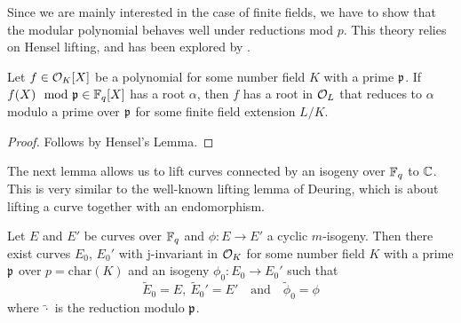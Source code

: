 Since we are mainly interested in the case of finite fields, we have to show that the modular polynomial behaves well under reductions mod $p$.
This theory relies on Hensel lifting, and has been explored by \cite{deuring_endomorphism_rings}.
\begin{lemma}
    \label{prop:modified_hensel_lifting}
    Let $f \in \mathcal{O}_K[X]$ be a polynomial for some number field $K$ with a prime $\mathfrak{p}$.
    If $f(X) \mod {\mathfrak{p}} \in \mathbb{F}_q[X]$ has a root $\alpha$, then $f$ has a root in $\mathcal{O}_L$ that reduces to $\alpha$ modulo a prime over $\mathfrak{p}$ for some finite field extension $L/K$.
\end{lemma}
\begin{proof}
    Follows by Hensel's Lemma.
\end{proof}
The next lemma allows us to lift curves connected by an isogeny over $\mathbb{F}_q$ to $\mathbb{C}$.
This is very similar to the well-known lifting lemma of Deuring, which is about lifting a curve together with an endomorphism.
\begin{lemma}
    Let $E$ and $E'$ be curves over $\mathbb{F}_q$ and $\phi: E \to E'$ a cyclic $m$-isogeny.
    Then there exist curves $E_0$, $E_0'$ with j-invariant in $\mathcal{O}_K$ for some number field $K$ with a prime $\mathfrak{p}$ over $p = \mathrm{char}(K)$ and an isogeny $\phi_0: E_0 \to E_0'$ such that
    \begin{equation*}
        \tilde{E}_0 = E, \ \tilde{E}_0' = E' \quad \text{and} \quad \tilde{\phi}_0 = \phi
    \end{equation*}
    where $\tilde{\cdot}$ is the reduction modulo $\mathfrak{p}$.
\end{lemma}
